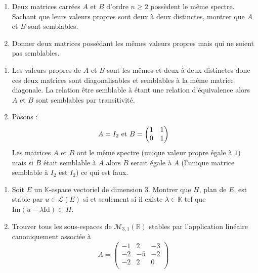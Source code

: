 \documentclass[a4paper,10pt]{report}
\begin{document}
\begin{Exa}
\begin{enumerate}
\item Deux matrices carrées $A$ et $B$ d'ordre $n \geq 2$ possèdent le même spectre. Sachant que leurs valeurs propres sont deux à deux distinctes, montrer que $A$ et $B$ sont semblables.
\item Donner deux matrices possédant les mêmes valeurs propres mais qui ne soient pas semblables.
\end{enumerate}
\end{Exa} 

\corr \begin{enumerate}
\item Les valeurs propres de $A$ et $B$ sont les mêmes et deux à deux distinctes donc ces deux matrices sont diagonalisables et semblables à la même matrice diagonale. La relation \og être semblable à \fg étant une relation d'équivalence alors $A$ et $B$ sont semblables par transitivité.
\item Posons :
$$ A = I_2 \hbox{ et } B = \begin{pmatrix}
1 & 1 \\
0 & 1 
\end{pmatrix}$$
Les matrices $A$ et $B$ ont le même spectre (unique valeur propre égale à $1$) mais si $B$ était semblable à $A$ alors $B$ serait égale à $A$ (l'unique matrice semblable à $I_2$ est $I_2$) ce qui est faux.
\end{enumerate}

\begin{Exa} \begin{enumerate}
\item Soit $E$ un $\mathbb{K}$-espace vectoriel de dimension $3$. Montrer que $H$, plan de $E$, est stable par $u \in \mathcal{L}(E)$ si et seulement si il existe $\lambda \in \mathbb{K}$ tel que $\textrm{Im}(u- \lambda \textrm{Id}) \subset H$.
\item Trouver tous les sous-espaces de $\mathcal{M}_{3,1}(\mathbb{R})$ stables par l'application linéaire canoniquement associée à 
$$A= \begin{pmatrix}
-1 & 2 & -3 \\
-2 & -5 & -2 \\
-2 & 2 & 0 \\
\end{pmatrix} $$
\end{enumerate}
\end{Exa}
\end{document}
